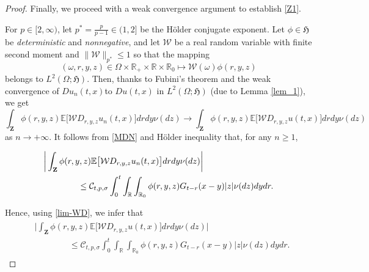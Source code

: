\documentclass[letterpaper, 11pt,  reqno]{amsart}
\newcommand{\noi}{\noindent}
\newcommand{\R}{\mathbb{R}}
\newcommand{\W}{\mathcal{W}}
\newcommand{\E}{\mathbb{E}}
\newcommand{\s}{\sigma}
\renewcommand{\o}{\omega}
\renewcommand{\O}{\Omega}
\newcommand{\fH}{\mathfrak{H}}
\numberwithin{equation}{section}
\numberwithin{theorem}{section}
\begin{document}
\begin{proof}
\smallskip


 Finally, we proceed with a weak convergence argument 
 to establish  \eqref{Z1}.
 

 For $p\in[2,\infty)$, let $p^\ast = \frac{p}{p-1}\in (1, 2]$ be the 
H\"older conjugate exponent. 
Let $\phi\in\fH$ be  \emph{deterministic} and {\it nonnegative},  and let $\W$ be a real
 random variable with finite second moment and
$\| \W \|_{p^\ast} \leq 1$
so that the mapping
\[
(\o, r, y, z)\in\O\times\R_+\times\R\times\R_0 \mapsto \W(\o) \phi(r,y,z)
\]
belongs to $L^2(\O; \fH)$.
Then, thanks to Fubini's theorem and  the weak convergence of  $Du_n(t,x)$to  $Du(t,x)$ in $L^2(\O; \fH)$ (due to Lemma \ref{lem_1}),
we get 
\begin{equation}
\label{lim-WD}
\int_{\mathbf{Z}}  \phi(r,y,z) \E\big[ \W D_{r, y, z} u_n(t,x) \big] drdy \nu(dz) 
\to \int_{\mathbf{Z}}  \phi(r,y,z) \E\big[ \W D_{r, y, z} u(t,x) \big] drdy \nu(dz) 
\end{equation}
as $n\to+\infty$. 
It follows from \eqref{MDN} and H\"older inequality that, for any $n\ge 1$,

\noi
\begin{align}   \notag%
\begin{aligned}  
&\bigg| \int_{\mathbf{Z}}  \phi(r,y,z) \E\big[ \W D_{r, y, z} u_n(t,x) \big] drdy \nu(dz)  \bigg| \\
& \qquad\qquad \leq
\mathcal{C}_{t,p,\s}  \int_{0}^t \int_{\R}\int_{\R_0}  \phi(r,y,z)  G_{t-r}(x-y) |z|   \nu(dz) dy dr. 
\end{aligned}
\end{align}

\noi
Hence, using \eqref{lim-WD}, we infer that
\begin{align}\label{Radon1}
\begin{aligned}  
&\bigg| \int_{\mathbf{Z}}  \phi(r,y,z) \E\big[ \W D_{r, y, z} u(t,x) \big] drdy \nu(dz)  \bigg| \\
& \qquad\qquad \leq
\mathcal{C}_{t,p,\s}  \int_{0}^t \int_{\R}\int_{\R_0}  \phi(r,y,z)  G_{t-r}(x-y) |z|   \nu(dz) dy dr. 
\end{aligned}
\end{align}



\end{proof}
\end{document}
